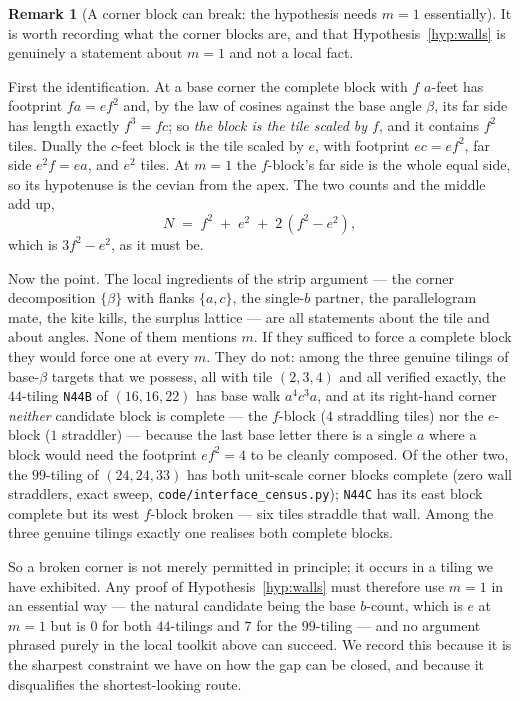 \documentclass[11pt,reqno]{amsart}
\theoremstyle{plain}
\theoremstyle{definition}
\newtheorem{remark}[theorem]{Remark}
\begin{document}
\begin{remark}[A corner block can break: the hypothesis needs $m=1$ essentially]\label{rem:blockbreaks}
It is worth recording what the corner blocks are, and that Hypothesis~\ref{hyp:walls} is genuinely a
statement about $m=1$ and not a local fact.

First the identification. At a base corner the complete block with $f$ $a$-feet has footprint $fa=ef^2$
and, by the law of cosines against the base angle $\beta$, its far side has length exactly $f^3=fc$;
so \emph{the block is the tile scaled by $f$}, and it contains $f^2$ tiles. Dually the $c$-feet block
is the tile scaled by $e$, with footprint $ec=ef^2$, far side $e^2f=ea$, and $e^2$ tiles. At $m=1$ the
$f$-block's far side is the whole equal side, so its hypotenuse is the cevian from the apex. The two
counts and the middle add up,
\[
N \;=\; f^2 \;+\; e^2 \;+\; 2\,(f^2-e^2),
\]
which is $3f^2-e^2$, as it must be.

Now the point. The local ingredients of the strip argument --- the corner decomposition
$\{\beta\}$ with flanks $\{a,c\}$, the single-$b$ partner, the parallelogram mate, the kite kills,
the surplus lattice --- are all statements about the tile and about angles. None of them mentions $m$.
If they sufficed to force a complete block they would force one at every $m$. They do not: among the
three genuine tilings of base-$\beta$ targets that we possess, all with tile $(2,3,4)$ and all
verified exactly, the $44$-tiling \texttt{N44B} of $(16,16,22)$ has base walk $a^4c^3a$, and at its
right-hand corner \emph{neither} candidate block is complete --- the $f$-block ($4$ straddling tiles)
nor the $e$-block ($1$ straddler) --- because the last base letter there is a single $a$ where a
block would need the footprint $ef^2=4$ to be cleanly composed. Of the other two, the $99$-tiling
of $(24,24,33)$ has both unit-scale corner blocks complete (zero wall straddlers, exact sweep,
\texttt{code/interface\_census.py}); \texttt{N44C} has its east block complete but its west
$f$-block broken --- six tiles straddle that wall. Among the three genuine tilings exactly one
realises both complete blocks.

So a broken corner is not merely permitted in principle; it occurs in a tiling we have exhibited.
Any proof of Hypothesis~\ref{hyp:walls} must therefore use $m=1$ in an essential way --- the natural
candidate being the base $b$-count, which is $e$ at $m=1$ but is $0$ for both $44$-tilings and $7$
for the $99$-tiling --- and no argument phrased purely in the local toolkit above can succeed. We
record this because it is the sharpest constraint we have on how the gap can be closed, and because
it disqualifies the shortest-looking route.
\end{remark}
\end{document}
